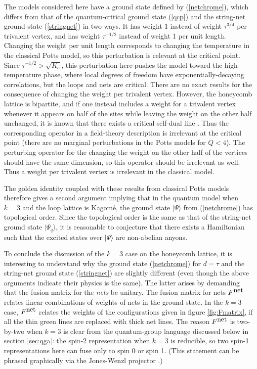 \documentclass[11pt]{article}
\begin{document}
The models considered here have a ground state defined by
(\ref{netchrome}), which differs from that of the quantum-critical
ground state (\ref{qcp}) and the string-net ground state
(\ref{stringnet}) in two ways. It has weight $1$ instead of weight
$\tau^{3/4}$ per trivalent vertex, and has weight $\tau^{-1/2}$
instead of weight 1 per
unit length. Changing the weight per unit length corresponds to
changing the temperature in the classical Potts model, so this
perturbation is relevant at the critical point. Since
$\tau^{-1/2}>\sqrt{K_c}$, this perturbation here pushes the model
toward the high-temperature phase, where local degrees of freedom have
exponentially-decaying correlations, but the loops and nets are
critical.  There are no exact results for the consequence of changing
the weight per trivalent vertex. However, the honeycomb lattice is
bipartite, and if one instead includes a weight for a trivalent vertex
whenever it appears on half of the sites while leaving the weight on
the other half unchanged, it is known that there exists a critical
self-dual line \cite{Wu}.  Thus the corresponding operator in a
field-theory description is irrelevant at the critical point (there
are no marginal perturbations in the Potts models for $Q<4$). The
perturbing operator for the changing the weight on the other half of
the vertices should have the same dimension, so this operator should
be irrelevant as well.  Thus a weight per trivalent vertex is
irrelevant in the classical model.

The golden identity coupled with these results from classical Potts
models therefore gives a second argument implying that in the quantum
model when $k=3$ and the loop lattice is Kagom\'e, the ground state
$|\Psi\rangle$ from (\ref{netchrome}) has topological order. Since the
topological order is the same as that of the string-net ground state
$|\Psi_q\rangle$, it is reasonable to conjecture that there exists a
Hamiltonian such that the excited states over $|\Psi\rangle$ are
non-abelian anyons.

To conclude the discussion of the $k=3$ case on the honeycomb lattice,
it is interesting to understand why the ground state (\ref{netchrome})
for $d=\tau$ and the string-net ground state (\ref{stringnet}) are
slightly different (even though the above arguments indicate their
physics is the same). The latter arises by demanding that the fusion
matrix for the {\em nets} be unitary. 
The fusion matrix for nets $F^{\hbox{net}}$ relates
linear combinations of weights of nets in the ground state. 
In the $k=3$ case, $F^{\hbox{net}}$
relates the weights of the configurations given
in figure \ref{fig:Fmatrix}, if all the
thin green lines are replaced with thick net lines. The reason
$F^{\hbox{net}}$ is two-by-two when $k=3$ is clear from
the quantum-group language discussed below in section
\ref{sec:qga}: the spin-2 representation when $k=3$ is reducible, so two
spin-1 representations here can fuse only to spin 0 or spin 1. (This
statement can be phrased graphically via the Jones-Wenzl projector \cite{FF,FKrush}.)
\end{document}
